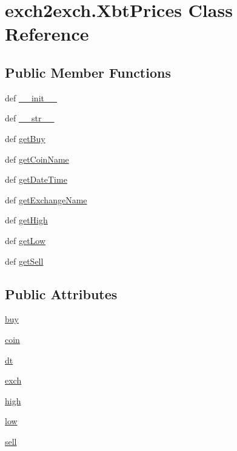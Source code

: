 \hypertarget{classexch2exch_1_1_xbt_prices}{\section{exch2exch.\-Xbt\-Prices Class Reference}
\label{classexch2exch_1_1_xbt_prices}
}
\subsection*{Public Member Functions}
\begin{DoxyCompactItemize}
\item 
def \hyperlink{classexch2exch_1_1_xbt_prices_a58a46b0407bcf03e0b7258fc20ba6de0}{\-\_\-\-\_\-init\-\_\-\-\_\-}
\item 
def \hyperlink{classexch2exch_1_1_xbt_prices_a5558eba2560c7d37c5308b7071f5c583}{\-\_\-\-\_\-str\-\_\-\-\_\-}
\item 
def \hyperlink{classexch2exch_1_1_xbt_prices_a6a2f6cbf5d274887ffcbfbe2eb77b358}{get\-Buy}
\item 
def \hyperlink{classexch2exch_1_1_xbt_prices_a657bf3d6e75d3bfe1fe408862b2a78cd}{get\-Coin\-Name}
\item 
def \hyperlink{classexch2exch_1_1_xbt_prices_ad1c937977f274b7a8ddb5868825ad592}{get\-Date\-Time}
\item 
def \hyperlink{classexch2exch_1_1_xbt_prices_a5c1eb62a961be8c36b93c0b1951d0b8d}{get\-Exchange\-Name}
\item 
def \hyperlink{classexch2exch_1_1_xbt_prices_a173ced43a9edb648a129dfa9ba4a4d66}{get\-High}
\item 
def \hyperlink{classexch2exch_1_1_xbt_prices_a38ab2c32172fd95a1bb9fe103b6d59cd}{get\-Low}
\item 
def \hyperlink{classexch2exch_1_1_xbt_prices_abcd54a52079952f45b5f29f3ffcd83b5}{get\-Sell}
\end{DoxyCompactItemize}
\subsection*{Public Attributes}
\begin{DoxyCompactItemize}
\item 
\hyperlink{classexch2exch_1_1_xbt_prices_a8f1d8ac0ef114ea3645314578697b7ac}{buy}
\item 
\hyperlink{classexch2exch_1_1_xbt_prices_a1191c8825e8f1333b4100b89fa2be053}{coin}
\item 
\hyperlink{classexch2exch_1_1_xbt_prices_af9f916c683c48631c97f1c5d91447751}{dt}
\item 
\hyperlink{classexch2exch_1_1_xbt_prices_a72caf3a29017a1ceaf4367240a46b360}{exch}
\item 
\hyperlink{classexch2exch_1_1_xbt_prices_aeae6235417d65d9e9c768a51c38d5388}{high}
\item 
\hyperlink{classexch2exch_1_1_xbt_prices_a8cef13f833a894d4fc5b8296bb4906fa}{low}
\item 
\hyperlink{classexch2exch_1_1_xbt_prices_a06fd0cfb03d485af3364a0d86fbe5385}{sell}
\end{DoxyCompactItemize}


